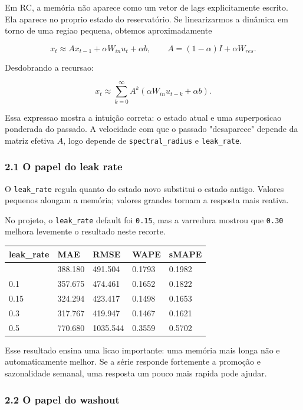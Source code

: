 \documentclass[12pt]{article}
\begin{document}
Em RC, a memória não aparece como um vetor de lags explicitamente escrito. Ela aparece no proprio estado do reservatório. Se linearizarmos a dinâmica em torno de uma regiao pequena, obtemos aproximadamente

\[
x_t \approx A x_{t-1} + \alpha W_{in} u_t + \alpha b,
\qquad
A = (1 - \alpha) I + \alpha W_{res}.
\]

Desdobrando a recursao:

\[
x_t \approx \sum_{k=0}^\infty A^k (\alpha W_{in} u_{t-k} + \alpha b).
\]

Essa expressao mostra a intuição correta: o estado atual e uma superposicao ponderada do passado. A velocidade com que o passado "desaparece" depende da matriz efetiva \(A\), logo depende de \texttt{spectral\_radius} e \texttt{leak\_rate}.

\subsubsection{2.1 O papel do leak rate}\label{21-o-papel-do-leak-rate}

O \texttt{leak\_rate} regula quanto do estado novo substitui o estado antigo. Valores pequenos alongam a memória; valores grandes tornam a resposta mais reativa.

No projeto, o \texttt{leak\_rate} default foi \texttt{0.15}, mas a varredura mostrou que \texttt{0.30} melhora levemente o resultado neste recorte.

\begin{longtable}[]{@{}lllll@{}}
\toprule\noalign{}
leak\_rate & MAE & RMSE & WAPE & sMAPE \\
\midrule\noalign{}
\endhead
\bottomrule\noalign{}
\endlastfoot
0.05 & 388.180 & 491.504 & 0.1793 & 0.1982 \\
0.1 & 357.675 & 474.461 & 0.1652 & 0.1822 \\
0.15 & 324.294 & 423.417 & 0.1498 & 0.1653 \\
0.3 & 317.767 & 419.947 & 0.1467 & 0.1621 \\
0.5 & 770.680 & 1035.544 & 0.3559 & 0.5702 \\
\end{longtable}

Esse resultado ensina uma licao importante: uma memória mais longa não e automaticamente melhor. Se a série responde fortemente a promoção e sazonalidade semanal, uma resposta um pouco mais rapida pode ajudar.

\subsubsection{2.2 O papel do washout}\label{22-o-papel-do-washout}
\end{document}
